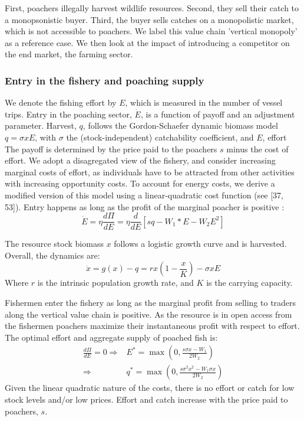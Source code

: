 First, poachers illegally harvest wildlife resources. Second, they sell their catch to a monopsonistic buyer. Third, the buyer sells catches on a monopolistic market, which is not accessible to poachers. We label this value chain 'vertical monopoly' as a reference case. We then look at the impact of introducing a competitor on the end market, the farming sector. 
%
\subsubsection{Entry in the fishery and poaching supply}
We denote the fishing effort by $E$, which is measured in the number of vessel trips. Entry in the poaching sector, $\dot{E}$, is a function of payoff and an adjustment parameter.  Harvest, $q$, follows the Gordon-Schaefer  dynamic biomass model  $q = \sigma x E$, with $\sigma$ the (stock-independent) catchability coefficient, and $E$, effort
The payoff is determined by the price paid to the poachers $s$ minus the cost of effort. We adopt a disagregated view of the fishery, and consider increasing marginal costs of effort, as individuals have to be attracted from other activities with increasing opportunity costs. To account for energy costs, we derive a modified version of this model using a linear-quadratic cost function (see [37, 53]). Entry happens as long as the profit of the marginal poacher is positive : 
\begin{equation}
    \dot{E}= \eta \frac{d\Pi}{dE} = \eta \frac{d}{dE}\left[ sq-W_1 * E - W_2E^2\right]
\end{equation}

The resource stock biomass $x$ follows a logistic growth curve and is harvested. Overall, the dynamics are: 
\begin{equation}
    \dot{x} = g(x) - q = rx\left(1 - \frac{x}{K}\right) - \sigma x E
    \label{eq:growth}
\end{equation}
Where $r$ is the intrinsic population growth rate,  and $K$ is the carrying capacity. 

Fishermen enter the fishery as long as the marginal profit from selling to traders along the vertical value chain is positive. As the resource is in open access from the fishermen poachers maximize their instantaneous profit with respect to effort. The optimal effort and aggregate supply of poached fish is:
\begin{align}
    \frac{d \Pi}{d E} = 0
    \Rightarrow & E^* = \max\left( 0, \frac{s \sigma x  -W_1}{2W_2} \right)\\
    \Rightarrow & q^* = \max\left(0, \frac{s\sigma^2 x^2 - W_1\sigma x}{2 W_2}\right)
    \label{eq:poachers_supply}
\end{align}
Given the linear quadratic nature of the costs, there is no effort or catch for low stock levels and/or low prices. Effort and catch increase with the price paid to poachers, $s$.


